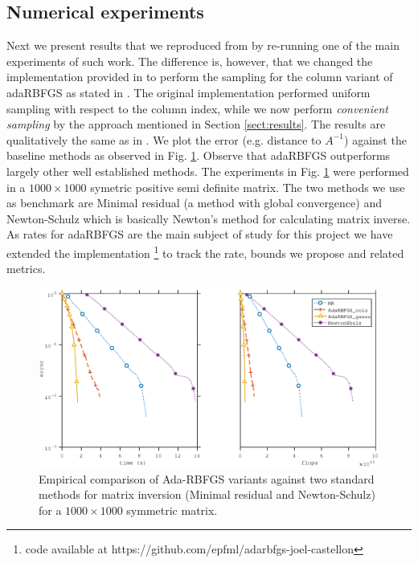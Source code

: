 \documentclass[12pt,conference,compsocconf]{IEEEtran}
\begin{document}
\vspace{-8mm}
\subsection{Numerical experiments}
Next we present results that we reproduced from \cite{Gower1} by re-running one of the main experiments of such work. The difference is, however, that we changed the implementation provided in \cite{Gowercode} to perform the sampling for the column variant of adaRBFGS as stated in \cite{Gower1}. The original implementation performed uniform sampling with respect to the column index, while we now perform \textit{convenient sampling} by the approach mentioned in Section \ref{sect:results}. The results are qualitatively the same as in \cite{Gower1}. We plot the error (e.g. distance to $A^{-1}$) against the baseline methods as observed in Fig. \ref{fig:comparison}. Observe that adaRBFGS outperforms largely other well established methods. The experiments in Fig. \ref{fig:comparison} were performed in a $1000\times1000$ symetric positive semi definite matrix. The two methods we use as benchmark are Minimal residual (a method with global convergence) and Newton-Schulz which is basically Newton's method for calculating matrix inverse. As rates for adaRBFGS are the main subject of study for this project we have extended the implementation \footnote{code available at https://github.com/epfml/adarbfgs-joel-castellon} to track the rate, bounds we propose and related metrics.
\begin{figure}
  \centering
  \includegraphics[height=0.7\columnwidth,width=1.1\columnwidth]{benchmark.eps}
  
  \vspace{-2mm}
  \caption{Empirical comparison of Ada-RBFGS variants against two standard methods for matrix inversion (Minimal residual and Newton-Schulz) for a $1000\times1000$ symmetric matrix.\label{fig:comparison}}
\end{figure}
\end{document}
